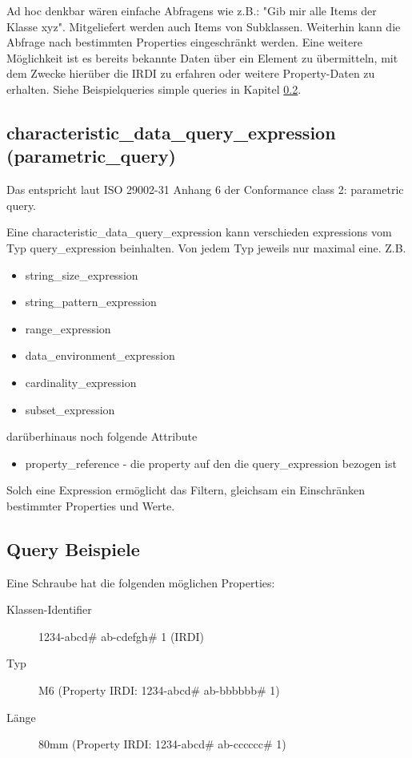 Ad hoc denkbar wären einfache Abfragens wie z.B.: "Gib mir alle Items der Klasse xyz". Mitgeliefert werden auch Items von Subklassen. Weiterhin kann die Abfrage nach bestimmten Properties eingeschränkt werden. Eine weitere Möglichkeit ist es bereits bekannte Daten über ein Element zu übermitteln, mit dem Zwecke hierüber die IRDI zu erfahren oder weitere Property-Daten zu erhalten. Siehe Beispielqueries simple queries in Kapitel \ref{kap:query_beispiele}. 

\subsection{characteristic\_data\_query\_expression (parametric\_query)}
Das entspricht laut ISO 29002-31 Anhang 6 der Conformance class 2: parametric query.

Eine characteristic\_data\_query\_expression kann verschieden expressions vom Typ query\_expression beinhalten. Von jedem Typ jeweils nur maximal eine. 
Z.B.
\begin{itemize}
\item string\_size\_expression
\item string\_pattern\_expression
\item range\_expression
\item data\_environment\_expression
\item cardinality\_expression
\item subset\_expression
\end{itemize}
darüberhinaus noch folgende Attribute

\begin{itemize}
\item property\_reference - die property auf den die query\_expression bezogen ist
\end{itemize}
Solch eine Expression ermöglicht das Filtern, gleichsam ein Einschränken bestimmter Properties und Werte. 

\subsection{Query Beispiele}\label{kap:query_beispiele}

Eine Schraube hat die folgenden möglichen Properties: 

\begin{description}
\item[Klassen-Identifier] 1234-abcd\# ab-cdefgh\# 1 (IRDI)
\item[Typ] M6 (Property IRDI: 1234-abcd\# ab-bbbbbb\# 1)
\item[Länge] 80mm (Property IRDI: 1234-abcd\# ab-cccccc\# 1)
\end{description}


